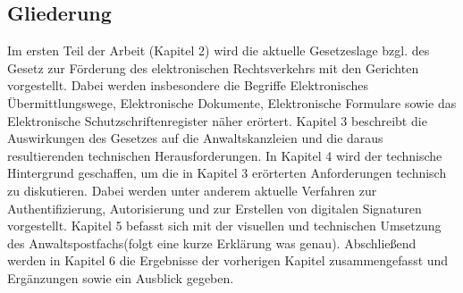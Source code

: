 \subsection*{Gliederung}
Im ersten Teil der Arbeit (Kapitel 2) wird die aktuelle Gesetzeslage bzgl. des Gesetz zur Förderung des elektronischen Rechtsverkehrs mit den Gerichten vorgestellt. Dabei werden insbesondere die Begriffe  Elektronisches Übermittlungswege, Elektronische Dokumente, Elektronische Formulare sowie das Elektronische Schutzschriftenregister näher erörtert. Kapitel 3 beschreibt die Auswirkungen des Gesetzes auf die Anwaltskanzleien und die daraus resultierenden technischen Herausforderungen. In Kapitel 4 wird der technische Hintergrund geschaffen, um die in Kapitel 3 erörterten Anforderungen technisch zu diskutieren. Dabei werden unter anderem aktuelle Verfahren zur Authentifizierung, Autorisierung und zur Erstellen von digitalen Signaturen vorgestellt. Kapitel 5 befasst sich mit der visuellen und technischen Umsetzung des Anwaltspostfachs(folgt eine kurze Erklärung was genau).  Abschließend werden in Kapitel 6 die Ergebnisse der vorherigen Kapitel zusammengefasst und Ergänzungen sowie ein Ausblick gegeben. 
\newpage

